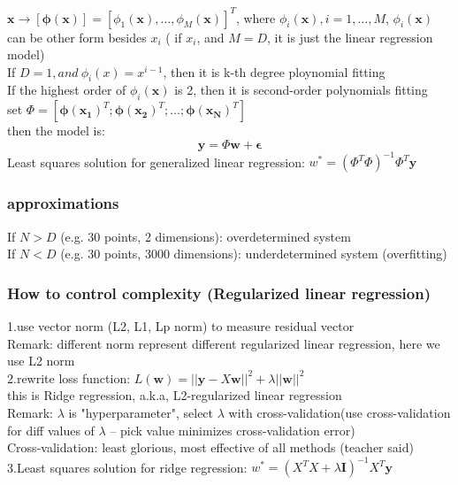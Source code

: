 \documentclass{article}
\begin{document}
			$\bm x \rightarrow [\bm \phi(\bm x)]=[ \phi_{1}(\bm x),\dots,\phi_{M}(\bm x) ]^{T}$, where $\phi_{i}(\bm x),i=1,\dots,M$, $\phi_{i}(\bm x)$ can be other form besides $x_{i}$ ( if $x_{i}$, and $M=D$, it is just the linear regression model)\\
			If $D=1, and\ \phi_{i}(x)=x^{i-1}$, then it is {\color {red} k-th degree ploynomial fitting}\\
			If the highest order of $\phi_{i}(\bm x)$ is 2, then it is {\color{red} second-order polynomials fitting}\\
			set $\Phi=[\bm\phi(\bm{x_{1}})^{T};\bm\phi(\bm{x_{2}})^{T};\dots;\bm\phi(\bm{x_{N}})^{T}]$\\
			then the model is: 
			$$
			\bm y=\Phi\bm w+\bm{\epsilon}
			$$
			Least squares solution for generalized linear regression: $ w^{*}=(\Phi^{T}\Phi)^{-1} \Phi^{T}\bm y$

		\subsubsection*{approximations}
			If $N>D$ (e.g. 30 points, 2 dimensions): overdetermined system\\
			If $N<D$ (e.g. 30 points, 3000 dimensions): underdetermined system (overfitting)
		\subsubsection*{How to control complexity (Regularized linear regression)}
			1.use vector norm (L2, L1, Lp norm) to measure residual vector\\
			Remark: different norm represent different regularized linear regression, here we use L2 norm\\

			\noindent 2.rewrite loss function: $L(\bm{w})=||\bm{y}-X\bm{w}||^{2}+\lambda||\bm{w}||^{2}$\\
			this is {\color{red} Ridge regression}, a.k.a, L2-regularized linear regression\\
			Remark: $\lambda$ is "hyperparameter", select $\lambda$ with cross-validation(use cross-validation for diff values of $\lambda$ -- pick value minimizes cross-validation error)\\

			\noindent Cross-validation: least glorious, most effective of all methods (teacher said)\\

			\noindent 3.Least squares solution for  ridge regression: $w^{*}=(X^{T}X+\lambda\bm{I})^{-1} X^{T}\bm y$
\end{document}

